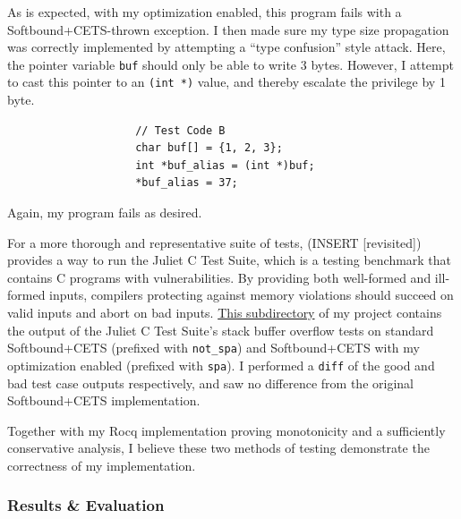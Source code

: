 \documentclass{article}
\begin{document}
                As is expected,  with my optimization enabled, this program fails with a Softbound+CETS-thrown 
                exception. I then made sure my type size propagation was correctly implemented
                by attempting a ``type confusion'' style attack. Here, the pointer
                variable \verb|buf| should only be able to write 3 bytes. However,
                I attempt to cast this pointer to an \verb|(int *)| value, and
                thereby escalate the privilege by 1 byte.

                \begin{verbatim}
                    // Test Code B
                    char buf[] = {1, 2, 3};
                    int *buf_alias = (int *)buf;
                    *buf_alias = 37;
                \end{verbatim}

                Again, my program fails as desired. 
                
                \bigbreak{}

                For a more thorough and representative
                suite of tests, (INSERT [revisited]) provides a way to run
                the Juliet C Test Suite, which is a testing benchmark that
                contains C programs with vulnerabilities. By providing both
                well-formed and ill-formed inputs, compilers protecting against
                memory violations should succeed on valid inputs and abort
                on bad inputs. \href{https://github.com/parthsarkar17/softboundcets-ese5370/tree/009263fa16b6ff7cc22f6afadf9561a9507f60b0/juliet-test-suite-c}{This subdirectory} of my project contains the
                output of the Juliet C Test Suite's stack buffer overflow tests on standard Softbound+CETS (prefixed with \verb|not_spa|)
                and Softbound+CETS with my optimization enabled (prefixed with \verb|spa|).
                I performed a \verb|diff| of the good and bad test case outputs respectively,
                and saw no difference from the original Softbound+CETS implementation.

                \bigbreak{}

                Together with my Rocq implementation proving monotonicity and a
                sufficiently conservative analysis, I believe these two methods of testing
                demonstrate the correctness of my implementation.

            \subsubsection{Results \& Evaluation}
\end{document}
